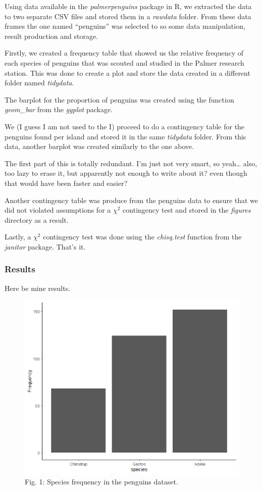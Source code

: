 \documentclass[
]{article}
\begin{document}
Using data available in the \emph{palmerpenguins} package in R, we
extracted the data to two separate CSV files and stored them in a
\emph{rawdata} folder. From these data frames the one named ``penguins''
was selected to so some data manipulation, result production and
storage.

Firstly, we created a frequency table that showed us the relative
frequency of each species of penguins that was scouted and studied in
the Palmer research station. This was done to create a plot and store
the data created in a different folder named \emph{tidydata}.

The barplot for the proportion of penguins was created using the
function \emph{geom\_bar} from the \emph{ggplot} package.

We (I guess I am not used to the I) proceed to do a contingency table
for the penguins found per island and stored it in the same
\emph{tidydata} folder. From this data, another barplot was created
similarly to the one above.

The first part of this is totally redundant. I'm just not very smart, so
yeah\ldots{} also, too lazy to erase it, but apparently not enough to
write about it? even though that would have been faster and easier?

Another contingency table was produce from the penguins data to ensure
that we did not violated assumptions for a \(\chi^{2}\) contingency test
and stored in the \emph{figures} directory as a result.

Lastly, a \(\chi^{2}\) contingency test was done using the
\emph{chisq.test} function from the \emph{janitor} package. That's it.

\hypertarget{results}{%
\subsubsection{Results}\label{results}}

Here be mine results.

\begin{figure}
\centering
\includegraphics{images/frequency_bar.png}
\caption{Fig. 1: Species frequency in the penguins dataset.}
\end{figure}
\end{document}
